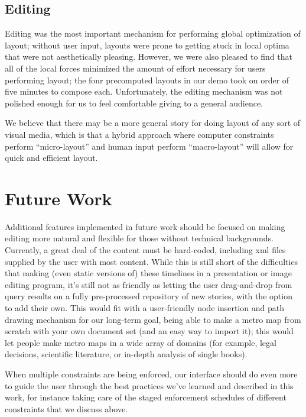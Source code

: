 \documentclass{chi2009}
\begin{document}
\subsection{Editing}

Editing was the most important mechanism for performing global optimization
of layout; without user input, layouts were prone to getting stuck in local
optima that were not aesthetically pleasing.  However, we were also pleased
to find that all of the local forces minimized the amount of effort necessary
for users performing layout; the four precomputed layouts in our demo took
on order of five minutes to compose each.  Unfortunately, the editing mechanism
was not polished enough for us to feel comfortable giving to a general audience.

We believe that there may be a more general story for doing layout of any sort of
visual media, which is that a hybrid approach where computer constraints perform
``micro-layout'' and human input perform ``macro-layout'' will allow for quick
and efficient layout.


\section{Future Work}

Additional features implemented in future work should be focused on making editing more natural and flexible for those without technical backgrounds. Currently, a great deal of the content must be hard-coded, including xml files supplied by the user with most content. While this is still short of the difficulties that making (even static versions of) these timelines in a presentation or image editing program, it's still not as friendly as letting the user drag-and-drop from query results on a fully pre-processed repository of new stories, with the option to add their own. This would fit with a user-friendly node insertion and path drawing mechanism for our long-term goal, being able to make a metro map from scratch with your own document set (and an easy way to import it); this would let people make metro maps in a wide array of domains (for example, legal decisions, scientific literature, or in-depth analysis of single books).

When multiple constraints are being enforced, our interface should do even more to guide the user through the best practices we’ve learned and described in this work, for instance taking care of the staged enforcement schedules of different constraints that we discuss above.
\end{document}
